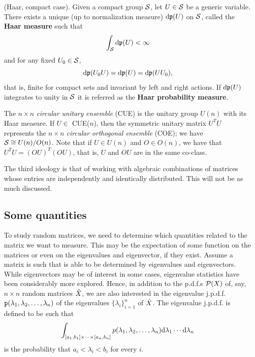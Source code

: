 \begin{teorema}
	(Haar, compact case). Given a compact group $\mathcal{S}$, let $U \in \mathcal{S}$ be a generic variable. There exists a unique (up to normalization measure) $\mathrm{d} \mathfrak{p}(U)$ on $\mathcal{S}$, called the \textbf{Haar measure} such that \begin{equation}\int_{\mathcal{S}} \mathrm{d} \mathfrak{p}(U) < \infty\end{equation} and for any fixed $U_0 \in \mathcal{S}$, $$\mathrm{d}\mathfrak{p}(U_0U) = \mathrm{d}\mathfrak{p}(U) = \mathrm{d}\mathfrak{p}(UU_0),$$ that is, finite for compact sets and invariant by left and right actions. If $\mathrm{d} \mathfrak{p}(U)$ integrates to unity in $\mathcal{S}$ it is referred as the \textbf{Haar probability measure}.
\end{teorema}

\begin{definition}
	The $n \times n$ \textit{circular unitary ensemble} (CUE) is the unitary group $U(n)$ with its Haar measure. If $U \in$ CUE($n$), then the symmetric unitary matrix $U^TU$ represents the $n \times n$ \textit{circular orthogonal ensemble} (COE); we have $\mathcal{S} \cong U(n)/O(n)$. Note that if $U \in U(n)$ and $O \in O(n)$, we have that $U^TU = (OU)^T(OU)$, that is, $U$ and $OU$ are in the same co-class.
\end{definition}

The third ideology is that of working with algebraic combinations of matrices whose entries are independently and identically distributed. This will not be as much discussed.

\subsection{Some quantities}

To study random matrices, we need to determine which quantities related to the matrix we want to measure. This may be the expectation of some function on the matrices or even on the eigenvalues and eigenvector, if they exist. Assume a matrix is such that is able to be determined by eigenvalues and eigenvectors. While eigenvectors may be of interest in some cases, eigenvalue statistics have been considerably more explored. Hence, in addition to the p.d.f.s $\mathcal{P}(X)$ of, say, $n \times n$ random matrices $\hat X$, we are also interested in the eigenvalue j.p.d.f. $\mathtt{p}(\lambda_1, \lambda_2, \dots, \lambda_n)$ of the eigenvalues $\{\lambda_i\}_{i=1}^{n}$ of $\hat X$. The eigenvalue j.p.d.f. is defined to be such that 
\begin{equation}
\int_{[a_1, b_1] \times \cdots \times [a_n, b_n]} p(\lambda_1, \lambda_2, \dots, \lambda_n) \mathrm{d} \lambda_1 \cdots \mathrm{d} \lambda_n
\end{equation}
is the probability that $a_i < \lambda_i < b_i$ for every $i$.

